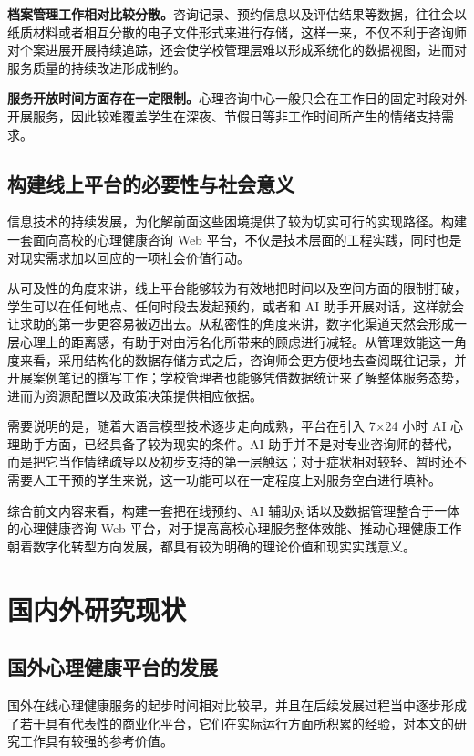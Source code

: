 \textbf{档案管理工作相对比较分散。}咨询记录、预约信息以及评估结果等数据，往往会以纸质材料或者相互分散的电子文件形式来进行存储，这样一来，不仅不利于咨询师对个案进展开展持续追踪，还会使学校管理层难以形成系统化的数据视图，进而对服务质量的持续改进形成制约。

\textbf{服务开放时间方面存在一定限制。}心理咨询中心一般只会在工作日的固定时段对外开展服务，因此较难覆盖学生在深夜、节假日等非工作时间所产生的情绪支持需求。

\subsection{构建线上平台的必要性与社会意义}

信息技术的持续发展，为化解前面这些困境提供了较为切实可行的实现路径。构建一套面向高校的心理健康咨询 Web 平台，不仅是技术层面的工程实践，同时也是对现实需求加以回应的一项社会价值行动。

从可及性的角度来讲，线上平台能够较为有效地把时间以及空间方面的限制打破，学生可以在任何地点、任何时段去发起预约，或者和 AI 助手开展对话，这样就会让求助的第一步更容易被迈出去。从私密性的角度来讲，数字化渠道天然会形成一层心理上的距离感，有助于对由污名化所带来的顾虑进行减轻。从管理效能这一角度来看，采用结构化的数据存储方式之后，咨询师会更方便地去查阅既往记录，并开展案例笔记的撰写工作；学校管理者也能够凭借数据统计来了解整体服务态势，进而为资源配置以及政策决策提供相应依据。

需要说明的是，随着大语言模型技术逐步走向成熟，平台在引入 7×24 小时 AI 心理助手方面，已经具备了较为现实的条件。AI 助手并不是对专业咨询师的替代，而是把它当作情绪疏导以及初步支持的第一层触达；对于症状相对较轻、暂时还不需要人工干预的学生来说，这一功能可以在一定程度上对服务空白进行填补。

综合前文内容来看，构建一套把在线预约、AI 辅助对话以及数据管理整合于一体的心理健康咨询 Web 平台，对于提高高校心理服务整体效能、推动心理健康工作朝着数字化转型方向发展，都具有较为明确的理论价值和现实实践意义。


\section{国内外研究现状}

\subsection{国外心理健康平台的发展}

国外在线心理健康服务的起步时间相对比较早，并且在后续发展过程当中逐步形成了若干具有代表性的商业化平台，它们在实际运行方面所积累的经验，对本文的研究工作具有较强的参考价值。

